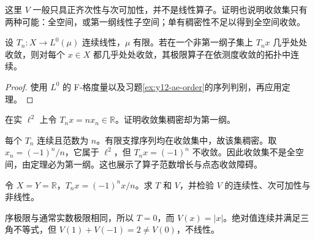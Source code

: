 这里 $V$ 一般只具正齐次性与次可加性，并不是线性算子。证明也说明收敛集只有两种可能：全空间，或第一纲线性子空间；单有稠密性不足以得到全空间收敛。

\begin{corollary}[几乎处处收敛的传递]
设 $T_n:X\to L^0(\mu)$ 连续线性，$\mu$ 有限。若在一个非第一纲子集上 $T_nx$ 几乎处处收敛，则对每个 $x\in X$ 都几乎处处收敛，其极限算子在依测度收敛的拓扑中连续。
\end{corollary}
\begin{proof}
使用 $L^0$ 的 F-格度量以及习题\ref{ex:y12-ae-order}的序列判别，再应用定理。
\end{proof}

\begin{exercise}[稠密的收敛集]\label{ex:y12-dense-convergence}
在实 $\ell^2$ 上令 $T_nx=nx_n\in\mathbb R$。证明收敛集稠密却为第一纲。
\end{exercise}
\begin{solution}
每个 $T_n$ 连续且范数为 $n$。有限支撑序列均在收敛集中，故该集稠密。取 $x_n=(-1)^n/n$，它属于 $\ell^2$，但 $T_nx=(-1)^n$ 不收敛。因此收敛集不是全空间，由定理必为第一纲。这也展示了算子范数增长与点态收敛障碍。
\end{solution}

\begin{exercise}[包络的非线性]\label{ex:y12-envelope}
令 $X=Y=\mathbb R$，$T_nx=(-1)^nx/n$。求 $T$ 和 $V$，并检验 $V$ 的连续性、次可加性与非线性。
\end{exercise}
\begin{solution}
序极限与通常实数极限相同，所以 $T=0$，而 $V(x)=|x|$。绝对值连续并满足三角不等式，但 $V(1)+V(-1)=2\ne V(0)$，不线性。
\end{solution}
